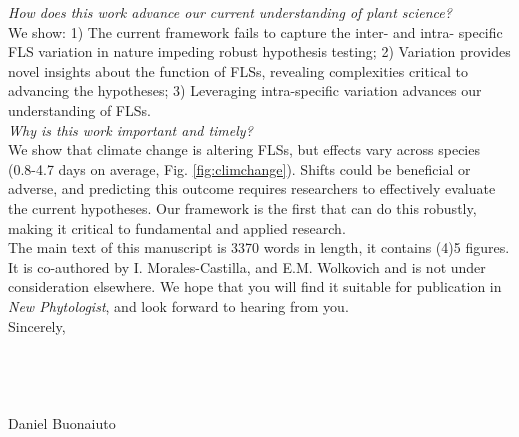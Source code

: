\documentclass[11pt,a4paper]{article}\usepackage[]{graphicx}\usepackage[]{color}
\begin{document}
\noindent \emph{How does this work advance our current understanding of plant science?}\\
\noindent We show: 1) The current framework fails to capture the inter- and intra- specific FLS variation in nature impeding robust hypothesis testing; 2) Variation provides novel insights about the function of FLSs, revealing complexities critical to advancing the hypotheses; 3) Leveraging intra-specific variation advances our understanding of FLSs.\\ %

\noindent \emph{Why is this work important and timely?}\\
\noindent We show that climate change is altering FLSs, but effects vary across species (0.8-4.7 days on average, Fig. \ref{fig:climchange}). Shifts could be beneficial or adverse, and predicting this outcome requires researchers to effectively evaluate the current hypotheses. Our framework is the first that can do this robustly, making it critical to fundamental and applied research.\\

\noindent The main text of this manuscript is 3370 words in length, it contains (4)5 figures. It is co-authored by I. Morales-Castilla, and E.M. Wolkovich and is not under consideration elsewhere. We hope that you will find it suitable for publication in \textit{New Phytologist}, and look forward to hearing from you.
\\Sincerely,\\\\\\\\\\

\noindent Daniel Buonaiuto\\
\pagebreak
\end{document}

